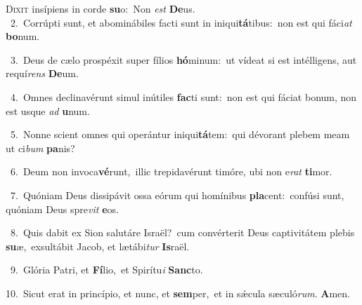 \lettrine{\initial\textcolor{\initialcolor}{D}}{ixit} insípiens in corde \textbf{su}\-o:~\star Non \textit{est} \textbf{De}\-us.\\
{\numbfont\textcolor{\numbcolor}{~2.}}~Corrúpti sunt, et abominábiles facti sunt in iniqui\-\textbf{tá}\-tibus:~\star non est qui fáci\textit{at} \textbf{bo}\-num.\par
{\numbfont\textcolor{\numbcolor}{~3.}}~Deus de cælo prospéxit super fílios \textbf{hó}\-minum:~\star ut vídeat si est intélligens, aut requí\textit{rens} \textbf{De}\-um.\par
{\numbfont\textcolor{\numbcolor}{~4.}}~Omnes declinavérunt simul inútiles \textbf{fac}\-ti sunt:~\star non est qui fáciat bonum, non est usque \textit{ad} \textbf{u}\-num.\par
{\numbfont\textcolor{\numbcolor}{~5.}}~Nonne scient omnes qui operántur iniqui\-\textbf{tá}\-tem:~\star qui dévorant plebem meam ut ci\textit{bum} \textbf{pa}\-nis?\par
{\numbfont\textcolor{\numbcolor}{~6.}}~Deum non invoca\-\textbf{vé}\-runt,~\star illic trepidavérunt timóre, ubi non e\textit{rat} \textbf{ti}\-mor.\par
{\numbfont\textcolor{\numbcolor}{~7.}}~Quóniam Deus dissipávit ossa eórum qui homínibus \textbf{pla}\-cent:~\star confúsi sunt, quóniam Deus spre\textit{vit} \textbf{e}\-os.\par
{\numbfont\textcolor{\numbcolor}{~8.}}~Quis dabit ex Sion salutáre Israël?~\dagger cum convérterit Deus captivitátem plebis \textbf{su}\-æ,~\star exsultábit Jacob, et lætábi\textit{tur} \textbf{Is}\-raël.\par
{\numbfont\textcolor{\numbcolor}{~9.}}~Glória Patri, et \textbf{Fí}\-lio,~\star et Spirítu\textit{i} \textbf{Sanc}\-to.\par
{\numbfont\textcolor{\numbcolor}{10.}}~Sicut erat in princípio, et nunc, et \textbf{sem}\-per,~\star et in sǽcula sæculó\-\textit{rum}\-. \textbf{A}\-men.\par
